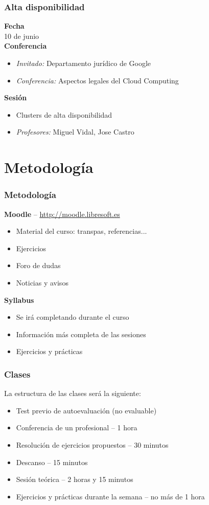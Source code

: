 \documentclass{beamer}
\begin{document}
\begin{frame}
  \frametitle{Alta disponibilidad}
  \textbf{Fecha}\\
    10 de junio\\
  \textbf{Conferencia}
    \begin{itemize}
      \item \textit{Invitado:} Departamento jurídico de Google
      \item \textit{Conferencia:} Aspectos legales del Cloud Computing
    \end{itemize}
  \textbf{Sesión}
    \begin{itemize}
      \item Clusters de alta disponibilidad
      \item \textit{Profesores:} Miguel Vidal, Jose Castro
    \end{itemize}
\end{frame}


\section{Metodología}
\begin{frame}
  \frametitle{Metodología}
  \begin{center}
    \textbf{Moodle} -- \url{http://moodle.libresoft.es}
  \end{center}
  \begin{itemize}
    \item Material del curso: transpas, referencias...
    \item Ejercicios
    \item Foro de dudas
    \item Noticias y avisos
  \end{itemize}
  \vspace{0.15cm}
  \begin{center}
    \textbf{Syllabus}\\
  \end{center}
  \begin{itemize}
    \item Se irá completando durante el curso
    \item Información más completa de las sesiones
    \item Ejercicios y prácticas
  \end{itemize}
\end{frame}

\begin{frame}
  \frametitle{Clases}
  La estructura de las clases será la siguiente:
  \begin{itemize}
    \item Test previo de autoevaluación (no evaluable)
    \item Conferencia de un profesional -- 1 hora
    \item Resolución de ejercicios propuestos -- 30 minutos
    \item Descanso -- 15 minutos
    \item Sesión teórica -- 2 horas y 15 minutos
    \item Ejercicios y prácticas durante la semana -- no más de 1 hora
  \end{itemize}
\end{frame}
\end{document}
